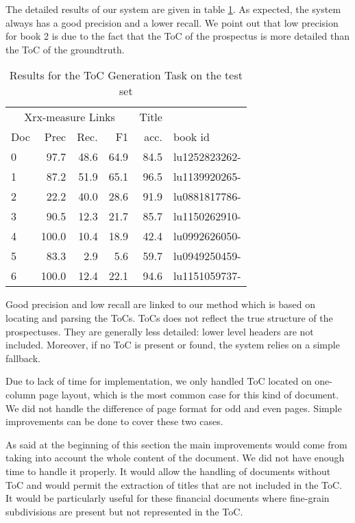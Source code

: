 The detailed results of our system are given in table \ref{res:detail}.
As expected, the system always has a good precision and a lower recall.
We point out that low precision for book 2 is due to the fact that
the ToC of the prospectus is more detailed than the ToC of the groundtruth.

\begin{table}
\begin{tabular}{l|r|r|r|r|l}
  \multicolumn{4}{c}{Xrx-measure Links}  &  Title & \\
 Doc &  Prec & Rec. &    F1 &  acc.  & book id      \\\hline
   0 &  97.7 & 48.6 &  64.9 &  84.5  & lu1252823262-\\\hline
   1 &  87.2 & 51.9 &  65.1 &  96.5  & lu1139920265-\\\hline
   2 &  22.2 & 40.0 &  28.6 &  91.9  & lu0881817786-\\\hline
   3 &  90.5 & 12.3 &  21.7 &  85.7  & lu1150262910-\\\hline
   4 & 100.0 & 10.4 &  18.9 &  42.4  & lu0992626050-\\\hline
   5 &  83.3 &  2.9 &   5.6 &  59.7  & lu0949250459-\\\hline
   6 & 100.0 & 12.4 &  22.1 &  94.6  & lu1151059737-\\\hline
\end{tabular}
\caption{Results for the ToC Generation Task on the test set}
\label{res:detail}
\end{table}

Good precision and low recall are linked to our method which is based on
locating and parsing the ToCs. ToCs does not reflect the true structure of the prospectuses. 
They are generally less detailed: lower level headers are not included. Moreover, 
if no ToC is present or found, the system relies on a simple fallback.

Due to lack of time for implementation, we only handled ToC located on one-column page layout, which is the most common case for this kind of document. We did not handle the difference of page format for odd and even pages. Simple improvements can be done to cover these two cases.

As said at the beginning of this section the main improvements would come from taking into account the whole content of the document. We did not have enough time to handle it properly. It would allow the handling of documents without ToC and would permit the extraction of titles that are not included in the ToC. It would be particularly useful for these financial documents where fine-grain subdivisions are present but not represented in the ToC.
